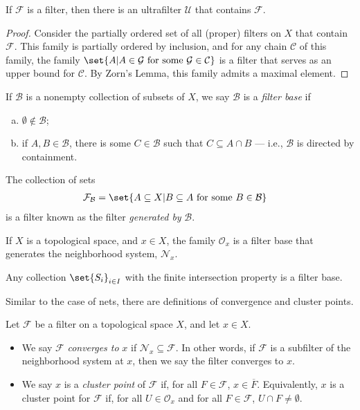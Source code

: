\documentclass[10pt]{mypackage}
\begin{document}
\begin{theorem}
  If $\mathcal{F}$ is a filter, then there is an ultrafilter $\mathcal{U}$ that contains $\mathcal{F}$.
\end{theorem}
\begin{proof}
  Consider the partially ordered set of all (proper) filters on $X$ that contain $\mathcal{F}$. This family is partially ordered by inclusion, and for any chain $\mathcal{C}$ of this family, the family $\set{A | A\in \mathcal{G}\text{ for some }\mathcal{G}\in \mathcal{C}}$ is a filter that serves as an upper bound for $\mathcal{C}$. By Zorn's Lemma, this family admits a maximal element.
\end{proof}
\begin{definition}
  If $\mathcal{B}$ is a nonempty collection of subsets of $X$, we say $\mathcal{B}$ is a \textit{filter base} if
  \begin{enumerate}[(a)]
    \item $\emptyset\notin \mathcal{B}$;
    \item if $A,B\in \mathcal{B}$, there is some $C\in \mathcal{B}$ such that $C\subseteq A\cap B$ --- i.e., $\mathcal{B}$ is directed by containment.
  \end{enumerate}
  The collection of sets
  \begin{align*}
    \mathcal{F}_{\mathcal{B}} &= \set{A\subseteq X | B\subseteq A\text{ for some }B\in \mathcal{B}}
  \end{align*}
  is a filter known as the filter \textit{generated by} $\mathcal{B}$.
\end{definition}
\begin{example}
  If $X$ is a topological space, and $x\in X$, the family $\mathcal{O}_{x}$ is a filter base that generates the neighborhood system, $\mathcal{N}_{x}$.
\end{example}
\begin{proposition}
  Any collection $\set{S_i}_{i\in I}$ with the finite intersection property is a filter base.
\end{proposition}
Similar to the case of nets, there are definitions of convergence and cluster points.
\begin{definition}
  Let $\mathcal{F}$ be a filter on a topological space $X$, and let $x\in X$.
  \begin{itemize}
    \item We say $\mathcal{F}$ \textit{converges to} $x$ if $\mathcal{N}_{x}\subseteq \mathcal{F}$. In other words, if $\mathcal{F}$ is a subfilter of the neighborhood system at $x$, then we say the filter converges to $x$.
    \item We say $x$ is a \textit{cluster point} of $\mathcal{F}$ if, for all $F\in \mathcal{F}$, $x\in \overline{F}$. Equivalently, $x$ is a cluster point for $\mathcal{F}$ if, for all $U\in \mathcal{O}_{x}$ and for all $F\in \mathcal{F}$, $U\cap F \neq \emptyset$.
  \end{itemize}
\end{definition}
\end{document}
